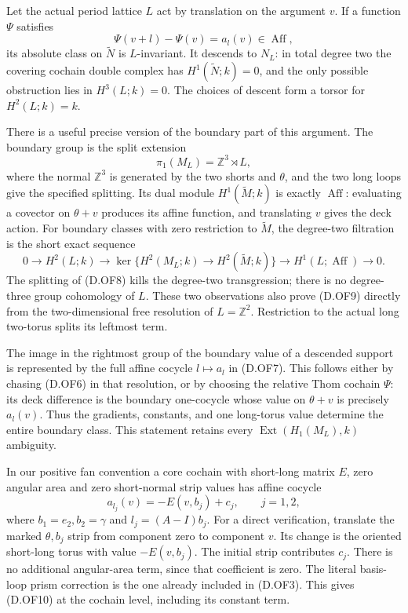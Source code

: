 Let the actual period lattice \(L\) act by translation on the
argument \(v\). If a function \(\Psi\) satisfies
\[
                  \Psi(v+l)-\Psi(v)=a_l(v)
                       \in\operatorname{Aff},           \tag{D.OF7}
\]
its absolute class on \(\widetilde N\) is \(L\)-invariant.
It descends to \(N_L\): in total degree two the covering
cochain double complex has \(H^1(\widetilde N;k)=0\), and
the only possible obstruction lies in \(H^3(L;k)=0\).
The choices of descent form a torsor for \(H^2(L;k)=k\).

There is a useful precise version of the boundary part of this
argument. The boundary group is the split extension
\[
       \pi_1(M_L)=\mathbb Z^3\rtimes L,                    \tag{D.OF8}
\]
where the normal \(\mathbb Z^3\) is generated by the two shorts
and \(\theta\), and the two long loops give the specified splitting.
Its dual module \(H^1(\widetilde M;k)\) is exactly
\(\operatorname{Aff}\): evaluating a covector on
\(\theta+v\) produces its affine function, and translating \(v\)
gives the deck action.
For boundary classes with zero restriction to \(\widetilde M\),
the degree-two filtration is the short exact sequence
\[
 0\longrightarrow H^2(L;k)\longrightarrow
 \ker\{H^2(M_L;k)\to H^2(\widetilde M;k)\}
 \longrightarrow H^1(L;\operatorname{Aff})\longrightarrow0.
                                                               \tag{D.OF9}
\]
The splitting of (D.OF8) kills the degree-two transgression;
there is no degree-three group cohomology of \(L\).
These two observations also prove (D.OF9) directly from the
two-dimensional free resolution of \(L=\mathbb Z^2\).
Restriction to the actual long two-torus splits its leftmost term.

The image in the rightmost group of the boundary value of a
descended support is represented by the full affine cocycle
\(l\mapsto a_l\) in (D.OF7). This follows either by chasing
(D.OF6) in that resolution, or by choosing the relative Thom
cochain \(\Psi\): its deck difference is the boundary one-cocycle
whose value on \(\theta+v\) is precisely \(a_l(v)\).
Thus the gradients, constants, and one long-torus value determine
the entire boundary class. This statement retains every
\(\operatorname{Ext}(H_1(M_L),k)\) ambiguity.

In our positive fan convention a core cochain with short-long
matrix \(E\), zero angular area and zero short-normal strip values
has affine cocycle
\[
 a_{l_j}(v)=-E(v,b_j)+c_j,\qquad j=1,2,                  \tag{D.OF10}
\]
where \(b_1=e_2,b_2=\gamma\) and \(l_j=(A-I)b_j\).
For a direct verification, translate the marked \(\theta,b_j\)
strip from component zero to component \(v\). Its change is the
oriented short-long torus with value \(-E(v,b_j)\).
The initial strip contributes \(c_j\). There is no additional
angular-area term, since that coefficient is zero. The literal
basis-loop prism correction is the one already included in
(D.OF3). This gives (D.OF10) at the cochain level, including
its constant term.

